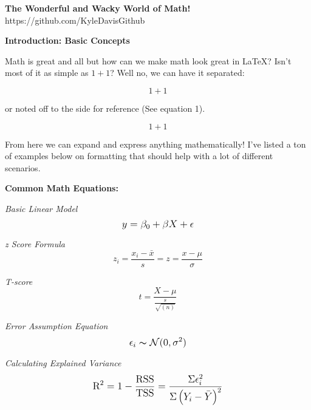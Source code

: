 \documentclass[12pt]{article}
\begin{document}
\setlength{\parindent}{0pt}
\setcounter{page}{1}
\singlespacing 

\begin{center}
\textbf{The Wonderful and Wacky World of Math!}\\
https://github.com/KyleDavisGithub
\end{center}
\textbf{Introduction: Basic Concepts}

Math is great and all but how can we make math look great in \LaTeX ? Isn't most of it as simple as $1+1$? Well no, we can have it separated:

$$ 1+1 $$

or noted off to the side for reference (See equation 1).

\begin{equation}
1+1
\end{equation}

From here we can expand and express anything mathematically! I've listed a ton of examples below on formatting that should help with a lot of different scenarios.

\hfill 

\textbf{Common Math Equations:}

\textit{Basic Linear Model}
\begin{equation}
\mathlarger{ y = \beta_0 + \beta X + \epsilon }
\end{equation}

\textit{z Score Formula}
\begin{equation}
z_i = \frac{x_i - \bar{x}}{s} = z = \frac{x - \mu}{\sigma}
\end{equation}

\textit{T-score}
\begin{equation}
t = \frac{X-\mu}{\frac{s}{\sqrt{(n)}}}
\end{equation}

\textit{Error Assumption Equation}
\begin{equation}
\mathlarger{  \epsilon_i  \thicksim \mathcal{N}(0, \sigma^2) }
\end{equation}

\textit{Calculating Explained Variance}
\begin{equation}
\mathlarger{ \text{R}^2 = 1 - \frac{\text{RSS}}{\text{TSS}} = \frac{\Sigma \epsilon^{2}_i}{\Sigma\left(Y_i - \bar{Y}\right)^2} }
\end{equation}
\end{document}
